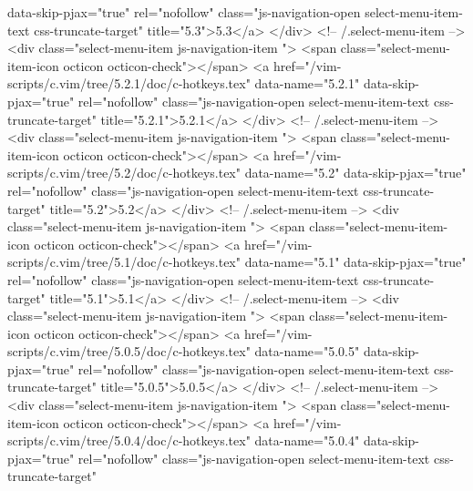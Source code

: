                  data-skip-pjax="true"
                 rel="nofollow"
                 class="js-navigation-open select-menu-item-text css-truncate-target"
                 title="5.3">5.3</a>
            </div> <!-- /.select-menu-item -->
            <div class="select-menu-item js-navigation-item ">
              <span class="select-menu-item-icon octicon octicon-check"></span>
              <a href="/vim-scripts/c.vim/tree/5.2.1/doc/c-hotkeys.tex"
                 data-name="5.2.1"
                 data-skip-pjax="true"
                 rel="nofollow"
                 class="js-navigation-open select-menu-item-text css-truncate-target"
                 title="5.2.1">5.2.1</a>
            </div> <!-- /.select-menu-item -->
            <div class="select-menu-item js-navigation-item ">
              <span class="select-menu-item-icon octicon octicon-check"></span>
              <a href="/vim-scripts/c.vim/tree/5.2/doc/c-hotkeys.tex"
                 data-name="5.2"
                 data-skip-pjax="true"
                 rel="nofollow"
                 class="js-navigation-open select-menu-item-text css-truncate-target"
                 title="5.2">5.2</a>
            </div> <!-- /.select-menu-item -->
            <div class="select-menu-item js-navigation-item ">
              <span class="select-menu-item-icon octicon octicon-check"></span>
              <a href="/vim-scripts/c.vim/tree/5.1/doc/c-hotkeys.tex"
                 data-name="5.1"
                 data-skip-pjax="true"
                 rel="nofollow"
                 class="js-navigation-open select-menu-item-text css-truncate-target"
                 title="5.1">5.1</a>
            </div> <!-- /.select-menu-item -->
            <div class="select-menu-item js-navigation-item ">
              <span class="select-menu-item-icon octicon octicon-check"></span>
              <a href="/vim-scripts/c.vim/tree/5.0.5/doc/c-hotkeys.tex"
                 data-name="5.0.5"
                 data-skip-pjax="true"
                 rel="nofollow"
                 class="js-navigation-open select-menu-item-text css-truncate-target"
                 title="5.0.5">5.0.5</a>
            </div> <!-- /.select-menu-item -->
            <div class="select-menu-item js-navigation-item ">
              <span class="select-menu-item-icon octicon octicon-check"></span>
              <a href="/vim-scripts/c.vim/tree/5.0.4/doc/c-hotkeys.tex"
                 data-name="5.0.4"
                 data-skip-pjax="true"
                 rel="nofollow"
                 class="js-navigation-open select-menu-item-text css-truncate-target"
